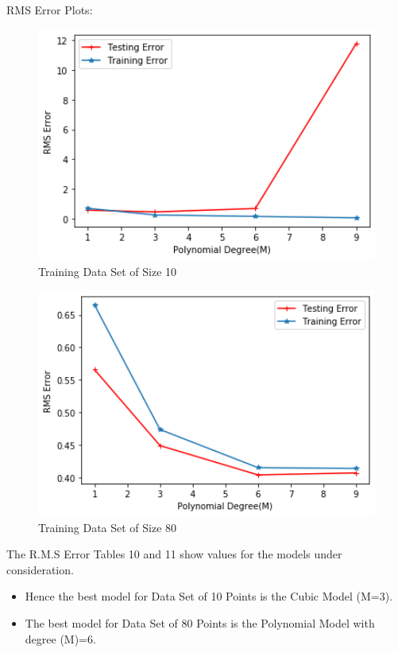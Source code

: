 \documentclass[a4 paper]{article}
\begin{document}
 RMS Error Plots:\\
\begin{figure}[!htb]
    \centering
    \begin{minipage}{0.49\textwidth}
        \centering
        \includegraphics[width=1\textwidth]{D=10 RMS Error.png} \\
         Training Data Set of Size 10
    \end{minipage}\hfill
    \begin{minipage}{0.49\textwidth}
        \centering
        \includegraphics[width=1\textwidth]{D=80 RMS Error.png}\\
         Training Data Set of Size 80
    \end{minipage}
    \label{fig:l}
\end{figure}
 The R.M.S Error Tables 10 and 11 show values for the models under consideration. \\
\begin{itemize}
    \item Hence the best model for Data Set of 10 Points is the Cubic Model (M=3).
    \item The best model for Data  Set of 80 Points is the Polynomial Model with degree (M)=6.

\end{itemize}
\end{document}
